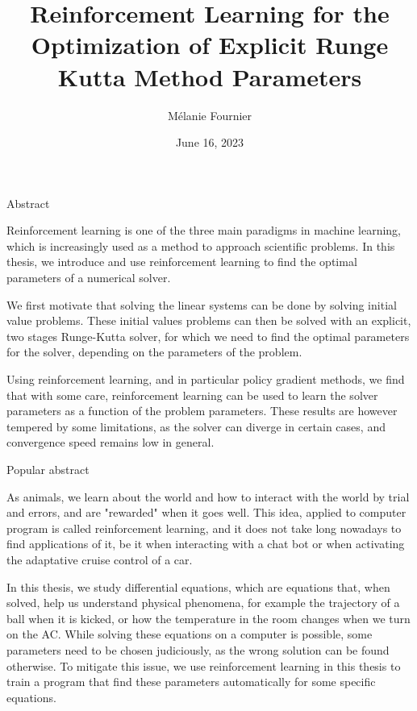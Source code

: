 \documentclass[
  letterpaper,
]{report}
\title{Reinforcement Learning for the Optimization of Explicit Runge
Kutta Method Parameters}
\author{Mélanie Fournier}
\date{June 16, 2023}
\theoremstyle{plain}
\theoremstyle{definition}
\theoremstyle{definition}
\theoremstyle{remark}
\begin{document}
\maketitle

\newpage


\begin{center}
\huge{Abstract}
\end{center}

\vspace*{\baselineskip}

Reinforcement learning is one of the three main paradigms in machine learning, which is increasingly used as a method to approach scientific problems. In this thesis, we introduce and use reinforcement learning to find the optimal parameters of a numerical solver.

We first motivate that solving the linear systems can be done by solving initial value problems. These initial values problems can then be solved with an explicit, two stages Runge-Kutta solver, for which we need to find the optimal parameters for the solver, depending on the parameters of the problem.   

Using reinforcement learning, and in particular policy gradient methods, we find that with some care, reinforcement learning can be used to learn the 
solver parameters as a function of the problem parameters. These results are however tempered by some limitations, as the solver can diverge in certain cases, and convergence speed remains low in general.

\vspace*{\baselineskip}

\begin{center}
\huge{Popular abstract}
\end{center}

\vspace*{\baselineskip}

As animals, we learn about the world and how to interact with the world by trial and errors, and are "rewarded" when it goes well. This idea, applied to computer program is called reinforcement learning, and it does not take long nowadays to find applications of it, be it when interacting with a chat bot or when activating the adaptative cruise control of a car.

In this thesis, we study differential equations, which are equations that, when solved, help us understand physical phenomena, for example the trajectory of a ball when it is kicked, or how the temperature in the room changes when we turn on the AC. While solving these equations on a computer is possible, some parameters need to be chosen judiciously, as the wrong solution can be found otherwise. To mitigate this issue, we use reinforcement learning in this thesis to train a program that find these parameters automatically for some specific equations.
\end{document}
